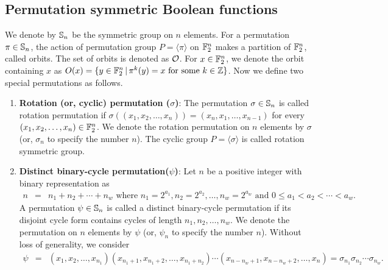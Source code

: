 \documentclass{llncs}
\begin{document}
\subsection{Permutation symmetric Boolean functions}\label{ssec:PSBF}
We denote by $\mathbb{S}_n$ be the symmetric group on $n$ elements. For a permutation $\pi\in \mathbb{S}_n$, the action of permutation group $P = \langle \pi \rangle$ on $\mathbb{F}_2^n$ makes a partition of $\mathbb{F}_2^n$, called orbits. The set of orbits is denoted as $\mathcal{O}$. For $x \in \mathbb{F}_2^n$, we denote the orbit containing $x$ as
$O(x) = \{y \in \mathbb{F}_2^n \,| \, \pi^k(y) = x \text{ for some } k \in \mathbb{Z}\}$. Now we define two special permutations as follows.
\begin{enumerate}
\item {\bf Rotation (or, cyclic) permutation ($\sigma$)}: The permutation $\sigma \in \mathbb{S}_n$ is called rotation permutation if $\sigma((x_1,x_2,\ldots,x_n)) = (x_n,x_1,\ldots,x_{n-1})$  for every $(x_1,x_2,\ldots,x_n) \in \mathbb{F}_2^n$. We denote the rotation permutation on $n$ elements by $\sigma$ (or, $\sigma_n$ to specify the number $n$).
The cyclic group $P = \langle \sigma \rangle$ is called rotation symmetric group.

\item {\bf Distinct binary-cycle permutation($\psi$)}: 
Let $n$ be a positive integer with binary representation as
\begin{eqnarray}\label{eqn:binn}
n & = & n_1 + n_2 + \cdots + n_w \text{ where } n_1 = 2^{a_1}, n_2 = 2^{a_2}, \ldots, n_w = 2^{a_w} \text{ and } 0 \leq a_1 < a_2 < \cdots < a_w.
\end{eqnarray}
A permutation $\psi \in \mathbb{S}_n$ is called a distinct binary-cycle permutation if its disjoint cycle form contains cycles of length $n_1, n_2,  \ldots, n_w$. We denote the permutation on $n$ elements by $\psi$ (or, $\psi_n$ to specify the number $n$).
Without loss of generality, we consider 
\begin{eqnarray}\label{eqn:cycperm}
\psi & = & (x_1, x_2, \ldots, x_{n_1}) (x_{n_1+1}, x_{n_1+2}, \ldots, x_{n_1+n_2})\cdots (x_{n-n_w+1}, x_{n-n_w+2}, \ldots, x_n) = \sigma_{n_1}\sigma_{n_2} \cdots\sigma_{n_w}.
\end{eqnarray}
\end{enumerate}
\end{document}
